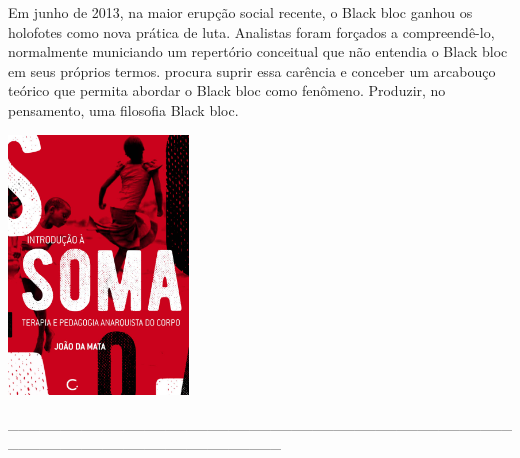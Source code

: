 \medskip

\noindent{}Em junho de 2013, na maior erupção social recente, o Black bloc ganhou os holofotes como nova prática de luta. Analistas foram forçados a compreendê-lo, normalmente municiando um repertório conceitual que não entendia o Black bloc em seus próprios termos. {} procura suprir essa carência e conceber um arcabouço teórico que permita abordar o Black bloc como fenômeno. Produzir, no pensamento, uma filosofia Black bloc.

\vfill

\hspace*{-.4cm}\begin{minipage}[c]{0.45\linewidth}
\small{
{}}
\end{minipage}

\pagebreak

\hspace{.5cm}

\begin{center}
\hspace*{-.5cm}\includegraphics[width=48mm]{./imgs/soma.jpg}
\end{center}

\hspace*{-2cm}\_\_\_\_\_\_\_\_\_\_\_\_\_\_\_\_\_\_\_\_\_\_\_\_\_\_\_\_\_\_\_\_\_\_\_\_\_\_\_\_\_\_\_\_\_\_\_\_\_\_\_\_\_\_\_\_\_\_\_\_\_\_\_\_\_\_\_\_\_\_\_\_\_\_

